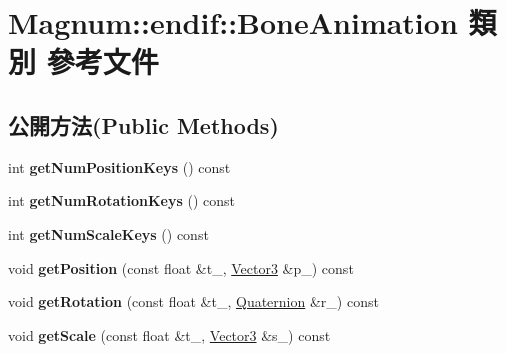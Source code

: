 \hypertarget{class_magnum_1_1endif_1_1_bone_animation}{}\section{Magnum\+:\+:endif\+:\+:Bone\+Animation 類別 參考文件}
\label{class_magnum_1_1endif_1_1_bone_animation}
\subsection*{公開方法(Public Methods)}
\begin{DoxyCompactItemize}
\item 
int {\bfseries get\+Num\+Position\+Keys} () const \hypertarget{class_magnum_1_1endif_1_1_bone_animation_add14a9ddfb8f9d2232acec5a4475c665}{}\label{class_magnum_1_1endif_1_1_bone_animation_add14a9ddfb8f9d2232acec5a4475c665}

\item 
int {\bfseries get\+Num\+Rotation\+Keys} () const \hypertarget{class_magnum_1_1endif_1_1_bone_animation_a08b5aa25f47d9f8d654eb8bac8ce4206}{}\label{class_magnum_1_1endif_1_1_bone_animation_a08b5aa25f47d9f8d654eb8bac8ce4206}

\item 
int {\bfseries get\+Num\+Scale\+Keys} () const \hypertarget{class_magnum_1_1endif_1_1_bone_animation_a77fe796c55c2a3dd746137861e13753e}{}\label{class_magnum_1_1endif_1_1_bone_animation_a77fe796c55c2a3dd746137861e13753e}

\item 
void {\bfseries get\+Position} (const float \&t\+\_\+, \hyperlink{class_magnum_1_1_vector3}{Vector3} \&p\+\_\+) const \hypertarget{class_magnum_1_1endif_1_1_bone_animation_aa649bd1d17a030c50d0727ea780462f6}{}\label{class_magnum_1_1endif_1_1_bone_animation_aa649bd1d17a030c50d0727ea780462f6}

\item 
void {\bfseries get\+Rotation} (const float \&t\+\_\+, \hyperlink{class_magnum_1_1_quaternion}{Quaternion} \&r\+\_\+) const \hypertarget{class_magnum_1_1endif_1_1_bone_animation_a4beff3b5279871568b7785eb287816c9}{}\label{class_magnum_1_1endif_1_1_bone_animation_a4beff3b5279871568b7785eb287816c9}

\item 
void {\bfseries get\+Scale} (const float \&t\+\_\+, \hyperlink{class_magnum_1_1_vector3}{Vector3} \&s\+\_\+) const \hypertarget{class_magnum_1_1endif_1_1_bone_animation_abccc8f47eaa542e92386210abf443504}{}\label{class_magnum_1_1endif_1_1_bone_animation_abccc8f47eaa542e92386210abf443504}


\end{DoxyCompactItemize}
